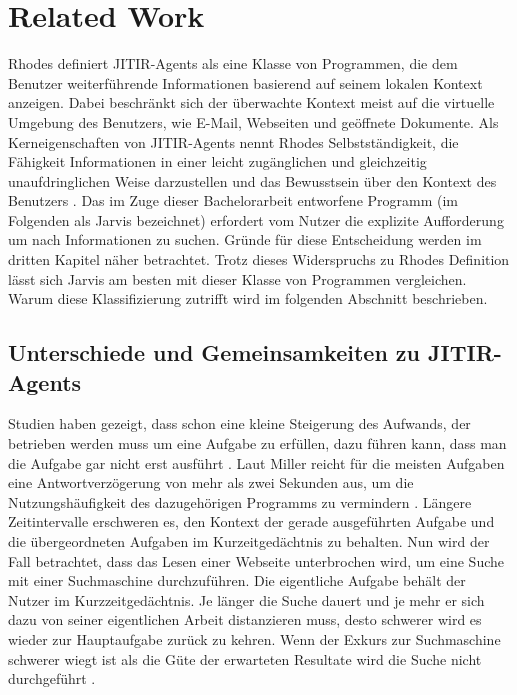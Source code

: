 \section{Related Work}
Rhodes \cite{rhodes2000just} definiert JITIR-Agents als eine Klasse von Programmen, die dem Benutzer weiterführende Informationen basierend auf seinem lokalen Kontext anzeigen. Dabei beschränkt sich der überwachte Kontext meist auf die virtuelle Umgebung des Benutzers, wie E-Mail, Webseiten und geöffnete Dokumente. Als Kerneigenschaften von JITIR-Agents nennt Rhodes Selbstständigkeit, die Fähigkeit Informationen in einer leicht zugänglichen und gleichzeitig unaufdringlichen Weise darzustellen und das Bewusstsein über den Kontext des Benutzers \cite{rhodes2000just}.
Das im Zuge dieser Bachelorarbeit entworfene Programm (im Folgenden als Jarvis bezeichnet) erfordert vom Nutzer die explizite Aufforderung um nach Informationen zu suchen. Gründe für diese Entscheidung werden im dritten Kapitel näher betrachtet. Trotz dieses Widerspruchs zu Rhodes Definition lässt sich Jarvis am besten mit dieser Klasse von Programmen vergleichen. Warum diese Klassifizierung zutrifft wird im folgenden Abschnitt beschrieben.

\subsection{Unterschiede und Gemeinsamkeiten zu JITIR-Agents}
Studien haben gezeigt, dass schon eine kleine Steigerung des Aufwands, der betrieben werden muss um eine Aufgabe zu erfüllen, dazu führen kann, dass man die Aufgabe gar nicht erst ausführt \cite{rhodes2000just}. Laut Miller reicht für die meisten Aufgaben eine Antwortverzögerung von mehr als zwei Sekunden aus, um die Nutzungshäufigkeit des dazugehörigen Programms zu vermindern \cite{miller1968response}. Längere Zeitintervalle erschweren es, den Kontext der gerade ausgeführten Aufgabe und die übergeordneten Aufgaben im Kurzeitgedächtnis zu behalten. Nun wird der Fall betrachtet, dass das Lesen einer Webseite unterbrochen wird, um eine Suche mit einer Suchmaschine durchzuführen. Die eigentliche Aufgabe behält der Nutzer im Kurzzeitgedächtnis. Je länger die Suche dauert und je mehr er sich dazu von seiner eigentlichen Arbeit distanzieren muss, desto schwerer wird es wieder zur Hauptaufgabe zurück zu kehren. Wenn der Exkurs zur Suchmaschine schwerer wiegt ist als die Güte der erwarteten Resultate wird die Suche nicht durchgeführt \cite{rhodes2000just}.

